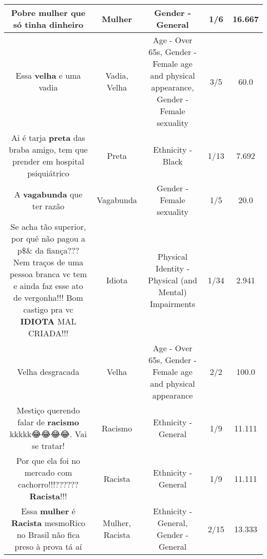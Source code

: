 \documentclass[11pt]{article}
\newlength\mylength
\begin{document}
\begin{center}
\begin{longtable}{|C{.65\mylength}|C{.30\mylength}|C{.12\mylength}|C{.12\mylength}|C{.12\mylength}|}
  \small Pobre \textbf{mulher} que só tinha dinheiro\normalsize   & Mulher & Gender - General & 1/6 & 16.667 \\  \hline
  \small Essa \textbf{v\textbf{elha}} e uma vadia\normalsize   & Vadia, Velha & Age - Over 65s, Gender - Female age and physical appearance, Gender - Female sexuality & 3/5 & 60.0 \\  \hline
  \small Ai é tarja \textbf{preta} das braba amigo, tem que prender em hospital psiquiátrico\normalsize   & Preta & Ethnicity - Black & 1/13 & 7.692 \\  \hline
  \small A \textbf{vagabunda} que ter razão\normalsize   & Vagabunda & Gender - Female sexuality & 1/5 & 20.0 \\  \hline
  \small Se acha tão superior, por quê não pagou a p\@\$\& da fiança??? Nem traços de uma pessoa branca vc tem e ainda faz esse ato de vergonha!!! Bom castigo pra vc \textbf{IDIOTA} MAL CRIADA!!!\normalsize   & Idiota & Physical Identity - Physical (and Mental) Impairments & 1/34 & 2.941 \\  \hline
  \small Velha desgracada\normalsize   & Velha & Age - Over 65s, Gender - Female age and physical appearance & 2/2 & 100.0 \\  \hline
  \small Mestiço querendo falar de \textbf{racismo} kkkkk😂😂😂😂. Vai se tratar!\normalsize   & Racismo & Ethnicity - General & 1/9 & 11.111 \\  \hline
  \small Por que ela foi no mercado com cachorro!!!?????? \textbf{Racista}!!!\normalsize   & Racista & Ethnicity - General & 1/9 & 11.111 \\  \hline
  \small Essa \textbf{mulher} é \textbf{Racista} mesmoRico no Brasil não fica preso à prova tá aí\normalsize   & Mulher, Racista & Ethnicity - General, Gender - General & 2/15 & 13.333 \\  \hline

\end{longtable}
\end{center}
\end{document}
